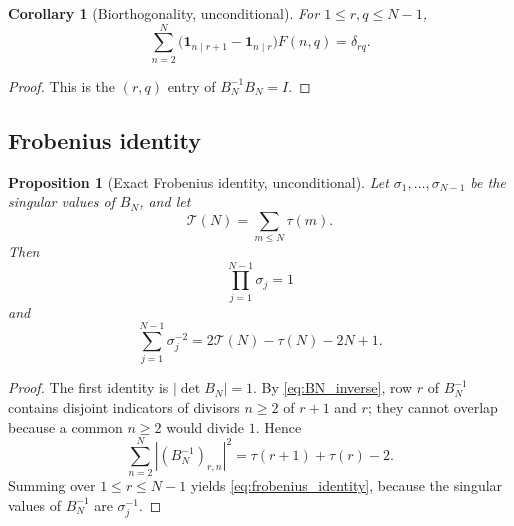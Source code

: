 \documentclass[11pt]{amsart}
\numberwithin{equation}{section}
\theoremstyle{plain}
\newtheorem{proposition}[theorem]{Proposition}
\newtheorem{corollary}[theorem]{Corollary}
\theoremstyle{definition}
\theoremstyle{remark}
\newcommand{\one}{\mathbf 1}
\newcommand{\Fsurf}{F}
\newcommand{\TauSum}{\mathcal T}
\begin{document}
\begin{corollary}[Biorthogonality, unconditional]
\label{cor:biorthogonality}
For $1\le r,q\le N-1$,
\begin{equation}
\sum_{n=2}^{N}
\bigl(\one_{n\mid r+1}-\one_{n\mid r}\bigr)\Fsurf(n,q)
=\delta_{rq}.
\label{eq:biorthogonality}
\end{equation}
\end{corollary}

\begin{proof}
This is the $(r,q)$ entry of $B_N^{-1}B_N=I$.
\end{proof}

\subsection{Frobenius identity}
\label{subsec:frobenius}

\begin{proposition}[Exact Frobenius identity, unconditional]
\label{prop:frobenius}
Let $\sigma_1,\ldots,\sigma_{N-1}$ be the singular values of $B_N$, and let
\begin{equation}
\TauSum(N)=\sum_{m\le N}\tau(m).
\label{eq:tau_summatory}
\end{equation}
Then
\begin{equation}
\prod_{j=1}^{N-1}\sigma_j=1
\label{eq:singular_product}
\end{equation}
and
\begin{equation}
\sum_{j=1}^{N-1}\sigma_j^{-2}
=2\TauSum(N)-\tau(N)-2N+1.
\label{eq:frobenius_identity}
\end{equation}
\end{proposition}

\begin{proof}
The first identity is $|\det B_N|=1$.  By \eqref{eq:BN_inverse}, row $r$ of $B_N^{-1}$ contains disjoint indicators of divisors $n\ge2$ of $r+1$ and $r$; they cannot overlap because a common $n\ge2$ would divide $1$.  Hence
\begin{equation}
\sum_{n=2}^{N}|(B_N^{-1})_{r,n}|^2
=\tau(r+1)+\tau(r)-2.
\label{eq:inverse_row_norm}
\end{equation}
Summing over $1\le r\le N-1$ yields \eqref{eq:frobenius_identity}, because the singular values of $B_N^{-1}$ are $\sigma_j^{-1}$.
\end{proof}
\end{document}
